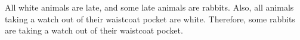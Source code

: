 \begin{exercises}




\item All white animals are late, and some late animals are rabbits. Also, all animals taking a watch out of their waistcoat pocket are white. Therefore, some rabbits are taking a watch out of their waistcoat pocket.








\end{exercises}
